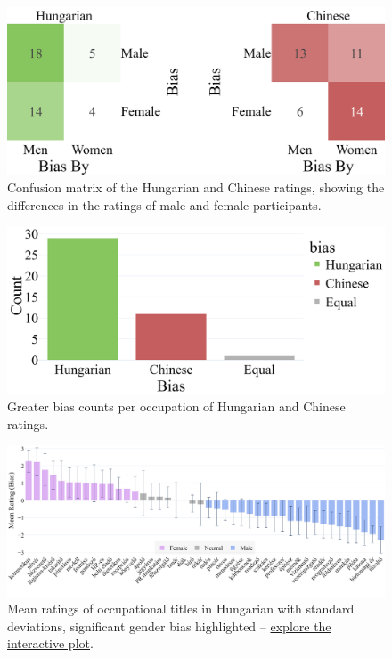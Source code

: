 \documentclass[11pt]{article}
\begin{document}
\bigskip

\begin{figure}[b]
  \centering
  \includegraphics[width=\linewidth]{../confusion_matrices}
  \caption{Confusion matrix of the Hungarian and Chinese ratings, showing the differences in the ratings of male and female participants.}  
  \label{fig:confusion_matrices}
\end{figure}

\begin{figure}[b]
  \centering
  \includegraphics[width=\linewidth]{../bias_counts}
  \caption{Greater bias counts per occupation of Hungarian and Chinese ratings.}  
  \label{fig:bias_counts}
\end{figure}



\begin{figure}[!ht]
  \centering
  \includegraphics[width=\linewidth]{../occupations_hu}
  \caption{Mean ratings of occupational titles in Hungarian with standard deviations, significant gender bias highlighted -- \href{https://anonymous.4open.science/api/repo/occupational-gender-bias/file/occupations_hu.html?v=93359859}{explore the interactive plot}.}
  \label{fig:occupations_hu}
\end{figure}
\end{document}
